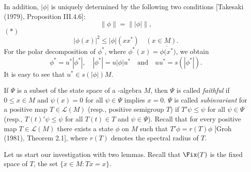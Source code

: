 In addition, $|\phi|$ is uniquely determined by the following two conditions [Takesaki (1979), Proposition III.4.6]:
\[
	\|\phi\| = \| |\phi| \|,
\]
$(*)$ 
\[
	|\phi(x)|^{2} \leq |\phi|(xx^{*}) \quad (x\in M).
\]
For the polar decomposition of $\phi^{*}$, where $\phi^{*}(x) = \overline{\phi(x^{*}})$, we obtain
\[
	\phi^{*} = u^{*}|\phi^{*}|, \quad |\phi^{*}| = u|\phi|u^{*} \quad \text{and} \quad 		uu^{*} = s(|\phi^{*}|).
\]
It is easy to see that $u^{*}\in s(|\phi|)M$.

If $\Psi$ is a subset of the state space of a \CA-algebra $M$, then $\Psi$ is called \emph{faithful} if $0 \leq x\in M$ and $\psi(x) = 0$ for all $\psi\in\Psi$ implies $x = 0$.
$\Psi$ is called \emph{subinvariant} for a positive map $T\in\mathcal{L}(M)$ (resp., positive semigroup $T$) if $T'\psi \leq \psi$ for all $\psi\in\Psi$ (resp., $T(t)'\psi \leq \psi$ for all $T(t)\in T$ and $\psi\in\Psi$).
Recall that for every positive map $T\in\mathcal{L}(M)$ there exists a state $\phi$ on $M$ such that $T'\phi = r(T)\phi$ [Groh (1981), Theorem 2.1], where $r(T)$ denotes the spectral radius of $T$.

Let us start our investigation with two lemmas.
Recall that $\Fix(T)$ is the fixed space of $T$, \ie the set $\{x\in M: Tx=x\}$.

\pagebreak

